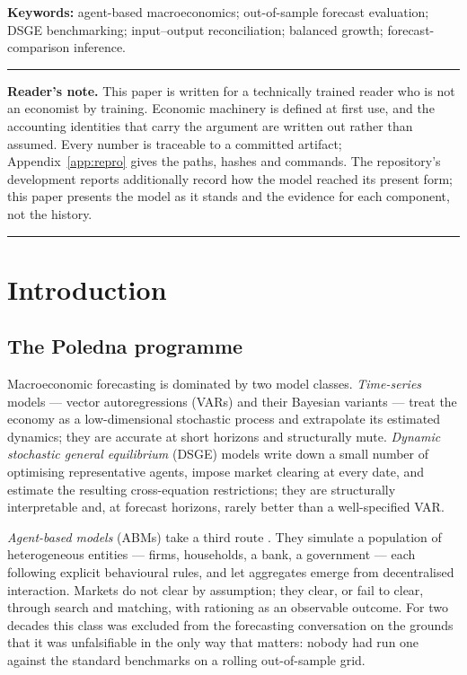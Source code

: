 \documentclass[11pt,a4paper]{article}
\begin{document}
\medskip
\noindent\textbf{Keywords:} agent-based macroeconomics; out-of-sample forecast evaluation;
DSGE benchmarking; input--output reconciliation; balanced growth; forecast-comparison inference.

\vspace{1em}
\hrule
\vspace{0.6em}
\noindent\small
\textbf{Reader's note.} This paper is written for a technically trained reader who is not an
economist by training. Economic machinery is defined at first use, and the accounting identities
that carry the argument are written out rather than assumed. Every number is traceable to a
committed artifact; Appendix~\ref{app:repro} gives the paths, hashes and commands. The
repository's development reports additionally record how the model reached its present form; this
paper presents the model as it stands and the evidence for each component, not the history.
\normalsize
\vspace{0.6em}
\hrule

\clearpage

\section{Introduction}
\label{sec:intro}

\subsection{The Poledna programme}

Macroeconomic forecasting is dominated by two model classes. \emph{Time-series} models --- vector
autoregressions (VARs) and their Bayesian variants --- treat the economy as a low-dimensional
stochastic process and extrapolate its estimated dynamics; they are accurate at short horizons
and structurally mute. \emph{Dynamic stochastic general equilibrium} (DSGE) models
\citep{smetswouters2007} write down a small number of optimising representative agents, impose
market clearing at every date, and estimate the resulting cross-equation restrictions; they are
structurally interpretable and, at forecast horizons, rarely better than a well-specified VAR.

\emph{Agent-based models} (ABMs) take a third route \citep{farmerfoley2009}. They simulate a
population of heterogeneous entities --- firms, households, a bank, a government --- each following
explicit behavioural rules, and let aggregates emerge from decentralised interaction. Markets do
not clear by assumption; they clear, or fail to clear, through search and matching, with rationing
as an observable outcome. For two decades this class was excluded from the forecasting
conversation on the grounds that it was unfalsifiable in the only way that matters: nobody had run
one against the standard benchmarks on a rolling out-of-sample grid.
\end{document}
